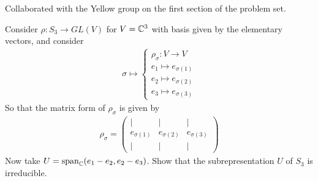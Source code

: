 \documentclass[num=4,duedate=03-03-21,course=Algebra\ II,proflastname=Walton]{hwtemplate}
\begin{document}

% 

\maketitle
Collaborated with the Yellow group on the first section of the problem set.
\pagebreak
\problem[1]
\begin{claim}
	Consider \(\rho:S_3 \to GL(V)\) for \(V = \mathbb{C}^3\) with basis given by the elementary vectors, and consider
	\begin{align*}
		\sigma\mapsto \begin{cases}
			\rho_\sigma:V\to V\\
			e_1\mapsto e_{\sigma(1)}\\
			e_2 \mapsto e_{\sigma(2)}\\
			e_3 \mapsto e_{\sigma(3)}
		\end{cases}
	\end{align*}
	So that the matrix form of \(\rho_\sigma\) is given by
	\begin{align*}
		\rho_\sigma = \begin{pmatrix} \mid &\mid &\mid \\ e_{\sigma(1)} & e_{\sigma(2)} & e_{\sigma(3)} \\ \mid  & \mid  & \mid  \end{pmatrix} 
	\end{align*}
	Now take \(U = \textrm{span}_{\mathbb{C}}(e_1-e_2,e_2-e_3)\). Show that the subrepresentation \(U\) of \(S_3\) is irreducible.
\end{claim}
\end{document}
